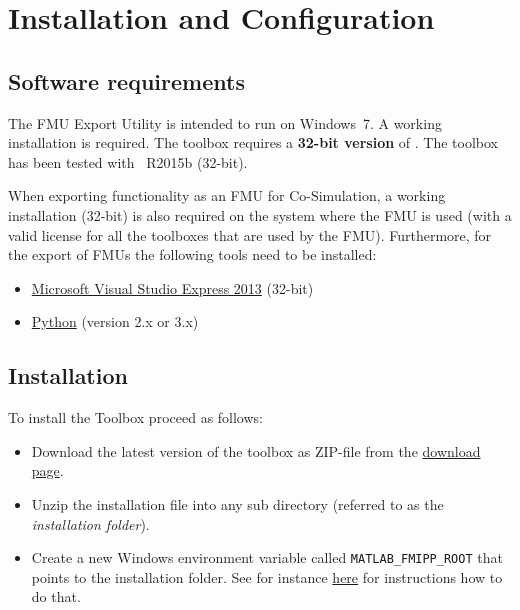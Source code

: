 \chapter{Installation and Configuration}

\section{Software requirements}

The \fmipp \matlab FMU Export Utility is intended to run on Windows~7.
A working \matlab installation is required.
The toolbox requires a \textbf{32-bit version} of \matlab.
The toolbox has been tested with \matlab~R2015b (32-bit).


When exporting \matlab functionality as an FMU for Co-Simulation, a working \matlab installation (32-bit) is also required on the system where the FMU is used (with a valid license for all the \matlab toolboxes that are used by the FMU).
Furthermore, for the export of FMUs the following tools need to be installed:
\begin{itemize}

  \item \href{https://www.microsoft.com/en-us/download/details.aspx?id=44914}{Microsoft Visual Studio Express 2013} (32-bit)

  \item \href{https://www.python.org/}{Python} (version 2.x or 3.x)
  
\end{itemize}


\section{Installation}
\label{sec:install}

To install the \fmipp \matlab Toolbox proceed as follows:
\begin{itemize}
  \item Download the latest version of the toolbox as ZIP-file from the \href{https://sourceforge.net/projects/matlab-fmu/files/latest/download}{download page}.
  
  \item Unzip the installation file into any sub directory (referred to as the \emph{installation folder}).
  
  \item Create a new Windows environment variable called \texttt{MATLAB\_FMIPP\_ROOT} that points to the installation folder.
  See for instance \href{http://www.computerhope.com/issues/ch000549.htm}{here} for instructions how to do that.
\end{itemize}


